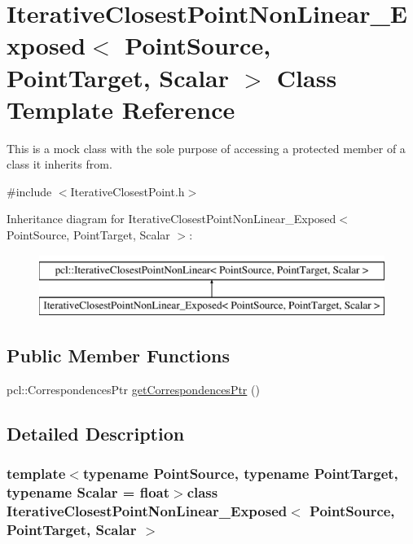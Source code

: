 \hypertarget{classIterativeClosestPointNonLinear__Exposed}{\section{Iterative\-Closest\-Point\-Non\-Linear\-\_\-\-Exposed$<$ Point\-Source, Point\-Target, Scalar $>$ Class Template Reference}
\label{classIterativeClosestPointNonLinear__Exposed}
}


This is a mock class with the sole purpose of accessing a protected member of a class it inherits from.  




{\ttfamily \#include $<$Iterative\-Closest\-Point.\-h$>$}

Inheritance diagram for Iterative\-Closest\-Point\-Non\-Linear\-\_\-\-Exposed$<$ Point\-Source, Point\-Target, Scalar $>$\-:\begin{figure}[H]
\begin{center}
\leavevmode
\includegraphics[height=2.000000cm]{classIterativeClosestPointNonLinear__Exposed}
\end{center}
\end{figure}
\subsection*{Public Member Functions}
\begin{DoxyCompactItemize}
\item 
pcl\-::\-Correspondences\-Ptr \hyperlink{classIterativeClosestPointNonLinear__Exposed_a8b5c6960d7914db1325d25e55d6d902b}{get\-Correspondences\-Ptr} ()
\end{DoxyCompactItemize}


\subsection{Detailed Description}
\subsubsection*{template$<$typename Point\-Source, typename Point\-Target, typename Scalar = float$>$class Iterative\-Closest\-Point\-Non\-Linear\-\_\-\-Exposed$<$ Point\-Source, Point\-Target, Scalar $>$}

